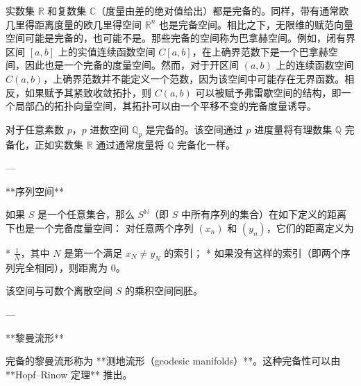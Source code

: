 实数集 $\mathbb{R}$ 和复数集 $\mathbb{C}$（度量由差的绝对值给出）都是完备的。同样，带有通常欧几里得距离度量的欧几里得空间 $\mathbb{R}^n$ 也是完备空间。相比之下，无限维的赋范向量空间可能是完备的，也可能不是。那些完备的空间称为巴拿赫空间。例如，闭有界区间 $[a, b]$ 上的实值连续函数空间 $C[a,b]$，在上确界范数下是一个巴拿赫空间，因此也是一个完备的度量空间。然而，对于开区间 $(a, b)$ 上的连续函数空间 $C(a,b)$，上确界范数并不能定义一个范数，因为该空间中可能存在无界函数。相反，如果赋予其紧致收敛拓扑，则 $C(a,b)$ 可以被赋予弗雷歇空间的结构，即一个局部凸的拓扑向量空间，其拓扑可以由一个平移不变的完备度量诱导。


对于任意素数 $p$，$p$ 进数空间 $\mathbb{Q}_p$ 是完备的。该空间通过 $p$ 进度量将有理数集 $\mathbb{Q}$ 完备化，正如实数集 $\mathbb{R}$ 通过通常度量将 $\mathbb{Q}$ 完备化一样。

---

**序列空间**

如果 $S$ 是一个任意集合，那么 $S^{\mathbb{N}}$（即 $S$ 中所有序列的集合）在如下定义的距离下也是一个完备度量空间：
对任意两个序列 $\left(x_n\right)$ 和 $\left(y_n\right)$，它们的距离定义为

* $\frac{1}{N}$，其中 $N$ 是第一个满足 $x_N \neq y_N$ 的索引；
* 如果没有这样的索引（即两个序列完全相同），则距离为 $0$。

该空间与可数个离散空间 $S$ 的乘积空间同胚。

---

**黎曼流形**

完备的黎曼流形称为 **测地流形（geodesic manifolds）**。这种完备性可以由 **Hopf–Rinow 定理** 推出。
